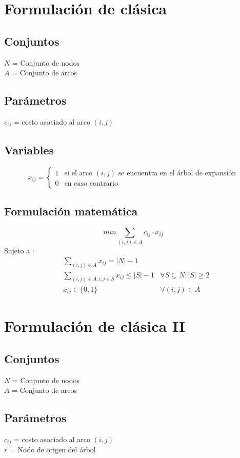 \documentclass{article}
\numberwithin{equation}{section}
\begin{document}
\section{Formulación de clásica}
\subsection{Conjuntos}
$N$ = Conjunto de nodos\\
$A$ = Conjunto de arcos
\subsection{Parámetros}
$c_{ij}$ = costo asociado al arco $(i,j)$
\subsection{Variables}
\begin{flushleft}
\[x_{ij}={\begin{cases}1&{\mbox{si el arco $(i,j)$ se encuentra en el árbol de expansión}}\\0&{\mbox{en caso contrario}}\end{cases}}
\]
\end{flushleft}
\subsection{Formulación matemática}
\begin{equation}
min \sum_{(i,j) \in A} c_{ij} \cdot x_{ij}
\end{equation}
Sujeto a : \begin{align}
& \sum_{(i,j) \in A} x_{ij} = |N| - 1\\
& \sum_{(i,j) \in A: i,j \in S} x_{ij} \leq |S| - 1 &\forall S \subseteq N : |S| \geq 2 \\
& x_{ij} \in \{0,1\} &\forall (i,j) \in A
\end{align}

\newpage
\section{Formulación de clásica II}
\subsection{Conjuntos}
$N$ = Conjunto de nodos\\
$A$ = Conjunto de arcos
\subsection{Parámetros}
$c_{ij}$ = costo asociado al arco $(i,j)$\\
$r$ = Nodo de origen del árbol
\end{document}
